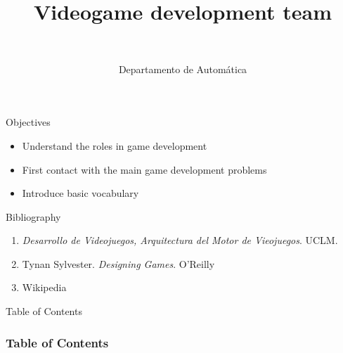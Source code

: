 \documentclass[10pt,compress]{beamer} %
\title[Videogame development team]{Videogame development team}
\author{\asignatura\\\carrera}
\institute{}
\date{Departamento de Automática}
\begin{document}
{\titlepageBlue
    \begin{frame}
        \titlepage
    \end{frame}
}

\institute{\asignatura}

\begin{frame}[plain]{}
   \begin{block}{Objectives}
   \begin{itemize}
        \item Understand the roles in game development
        \item First contact with the main game development problems
		\item Introduce basic vocabulary
	\end{itemize}
	\end{block}

   \begin{block}{Bibliography}
      \begin{enumerate}
          \item  \textit{Desarrollo de Videojuegos, Arquitectura del Motor de Vieojuegos}. UCLM.
          \item Tynan Sylvester. \textit{Designing Games}. O'Reilly
          \item Wikipedia
      \end{enumerate} 
   \end{block}
\end{frame}

{
\begin{frame}[shrink]{Table of Contents}
 \frametitle{Table of Contents}
 \tableofcontents
\end{frame}
}
\end{document}
